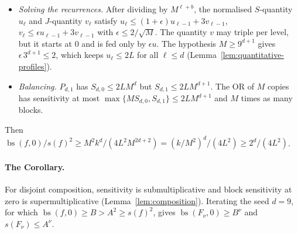 \documentclass[11pt]{article}
\newcommand{\bs}{\operatorname{bs}}
\theoremstyle{definition}
\theoremstyle{remark}
\begin{document}
\begin{itemize}[leftmargin=1.5em]
 \(J_{\ell,1}\le M^2J_{\ell-1,0}+rS_{\ell-1,1}\) and
 \(J_{\ell,0}\le16\,S_{\ell-1,0}+3J_{\ell-1,1}\). In the last bound even the
 exceptional clause is charged \(J_{\ell-1,1}\): making a clause hold for two
 parent indices \(q<q'\) forces two child gate predicates to change.
\item \emph{Solving the recurrences.} After dividing by \(M^{\ell+b}\), the
 normalised \(S\)-quantity \(u_\ell\) and \(J\)-quantity \(v_\ell\) satisfy
 \(u_\ell\le(1+\epsilon)u_{\ell-1}+3v_{\ell-1}\),
 \(v_\ell\le\epsilon u_{\ell-1}+3v_{\ell-1}\) with
 \(\epsilon\le 2/\sqrt M\). The quantity \(v\) may triple per level, but it
 starts at \(0\) and is fed only by \(\epsilon u\). The hypothesis
 \(M\ge 9^{d+1}\) gives \(\epsilon\,3^{d+1}\le 2\), which keeps
 \(u_\ell\le 2L\) for all \(\ell\le d\)
 (Lemma~\ref{lem:quantitative-profiles}).
\item \emph{Balancing.} \(P_{d,1}\) has \(S_{d,0}\le2LM^{d}\) but
 \(S_{d,1}\le 2LM^{d+1}\). The OR of \(M\) copies has sensitivity at most
 \(\max\{MS_{d,0},S_{d,1}\}\le 2LM^{d+1}\) and \(M\) times as many blocks.
\end{itemize}
Then
\(\bs(f,0)/s(f)^2\ge M^2k^d/(4L^2M^{2d+2})=(k/M^2)^d/(4L^2)\ge2^d/(4L^2)\).

\paragraph{The Corollary.}
For disjoint composition, sensitivity is submultiplicative and block
sensitivity at zero is supermultiplicative (Lemma~\ref{lem:composition}).
Iterating the seed \(d=9\), for which \(\bs(f,0)\ge B>A^2\ge s(f)^2\), gives
\(\bs(F_\nu,0)\ge B^\nu\) and \(s(F_\nu)\le A^\nu\).
\end{document}
